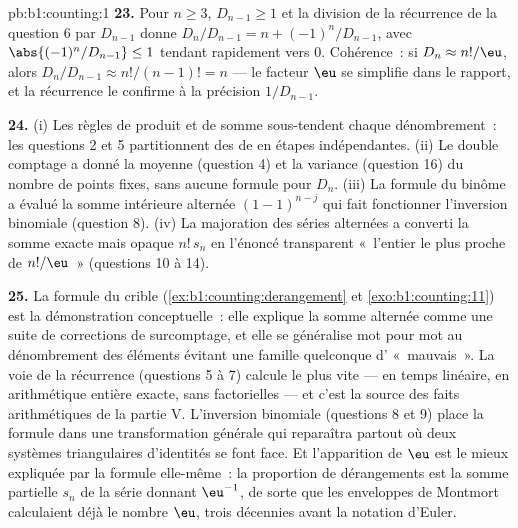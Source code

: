 \begin{solution}{pb:b1:counting:1}
\textbf{23.} Pour $n \geq 3$, $D_{n-1} \geq 1$ et la division de la
récurrence de la question 6 par $D_{n-1}$ donne $D_n/D_{n-1} = n +
(-1)^n/D_{n-1}$, avec $\abs{(-1)^n/D_{n-1}} \leq 1$ tendant rapidement
vers $0$. Cohérence~: si $D_n \approx n!/\eu$, alors
$D_n/D_{n-1} \approx n!/(n-1)! = n$ --- le facteur $\eu$ se simplifie
dans le rapport, et la récurrence le confirme à la précision
$1/D_{n-1}$.

\textbf{24.} (i) Les règles de produit et de somme sous-tendent chaque
dénombrement~: les questions 2 et 5 partitionnent des  de
 en étapes indépendantes. (ii) Le double comptage a donné la
moyenne (question 4) et la variance (question 16) du nombre de points
fixes, sans aucune formule pour $D_n$. (iii) La formule du binôme a évalué
la somme intérieure alternée $(1-1)^{n-j}$ qui fait fonctionner
l'inversion binomiale (question 8). (iv) La majoration des séries
alternées a converti la somme exacte mais opaque $n!\,s_n$ en l'énoncé
transparent «~l'entier le plus proche de $n!/\eu$~» (questions 10 à 14).

\textbf{25.} La formule du crible
(\cref{ex:b1:counting:derangement} et \cref{exo:b1:counting:11})
est la démonstration conceptuelle~: elle explique la somme alternée comme
une suite de corrections de surcomptage, et elle se généralise mot pour mot
au dénombrement des éléments évitant une famille quelconque d'
«~mauvais~». La voie de la récurrence (questions 5 à 7) calcule le plus
vite --- en temps linéaire, en arithmétique entière exacte, sans
factorielles --- et c'est la source des faits arithmétiques de la partie V.
L'inversion binomiale (questions 8 et 9) place la formule dans une
transformation générale qui reparaîtra partout où deux systèmes
triangulaires d'identités se font face. Et l'apparition de $\eu$ est le
mieux expliquée par la formule elle-même~: la proportion de dérangements
est la somme partielle $s_n$ de la série donnant $\eu^{-1}$, de sorte que
les enveloppes de Montmort calculaient déjà le nombre $\eu$, trois
décennies avant la notation d'Euler.
\end{solution}
